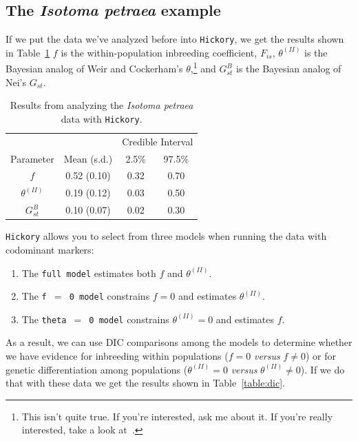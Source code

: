 \documentclass[12pt]{article}
\begin{document}
\subsection*{The {\it Isotoma petraea} example}

If we put the data we've analyzed before into {\tt Hickory}, we get
the results shown in Table~\ref{table:james} $f$ is the
within-population inbreeding coefficient, $F_{is}$, $\theta^{(II)}$ is
the Bayesian analog of Weir and Cockerham's $\theta$,\footnote{This
  isn't quite true. If you're interested, ask me about it. If you're
  really interested, take a look at~\cite{Song-etal-2006}.}  and
$G_{st}^B$ is the Bayesian analog of Nei's $G_{st}$.

\begin{table}
\begin{center}
\begin{tabular}{cccc}
\hline\hline
           &             & \multicolumn{2}{c}{Credible Interval} \\
Parameter  & Mean (s.d.)     & 2.5\% & 97.5\% \\
\hline
$f$            & 0.52 (0.10) & 0.32 & 0.70 \\
$\theta^{(II)}$ & 0.19 (0.12) & 0.03 & 0.50 \\
$G_{st}^B$      & 0.10 (0.07) & 0.02 & 0.30 \\
\hline
\end{tabular}
\caption{Results from analyzing the {\it Isotoma petraea} data with
  {\tt Hickory}.}\label{table:james}
\end{center}
\end{table}

{\tt Hickory} allows you to select from three models when running the
data with codominant markers:

\begin{enumerate}

\item The {\tt full model} estimates both $f$ and $\theta^{(II)}$.

\item The {\tt f $=$ 0 model} constrains $f=0$ and estimates
  $\theta^{(II)}$. 

\item The {\tt theta $=$ 0 model} constrains $\theta^{(II)} = 0$ and
  estimates $f$.

\end{enumerate}

As a result, we can use DIC comparisons among the models to determine
whether we have evidence for inbreeding within populations ($f=0$ {\it
  versus} $f \ne 0$) or for genetic differentiation among populations
($\theta^{(II)}=0$ {\it versus} $\theta^{(II)} \ne 0$). If we do that with these
data we get the results shown in Table~\ref{table:dic}.
\end{document}
